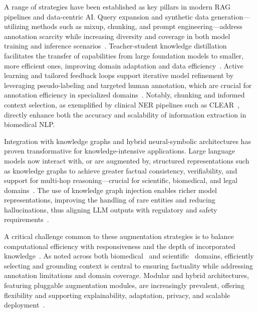 \documentclass[sigconf]{acmart}
\begin{document}
A range of strategies have been established as key pillars in modern RAG pipelines and data-centric AI. Query expansion and synthetic data generation—utilizing methods such as mixup, chunking, and prompt engineering—address annotation scarcity while increasing diversity and coverage in both model training and inference scenarios~\cite{ref5, ref10, ref12, ref15, ref16, ref22, ref24, ref31, ref32, ref36, ref37, ref43, ref48, ref49, ref52, ref54, ref55, ref61, ref62}. Teacher-student knowledge distillation facilitates the transfer of capabilities from large foundation models to smaller, more efficient ones, improving domain adaptation and data efficiency~\cite{ref32, ref33, ref55}. Active learning and tailored feedback loops support iterative model refinement by leveraging pseudo-labeling and targeted human annotation, which are crucial for annotation efficiency in specialized domains~\cite{ref31, ref32, ref55}. Notably, chunking and informed context selection, as exemplified by clinical NER pipelines such as CLEAR~\cite{ref3, ref5, ref36, ref43, ref54, ref61}, directly enhance both the accuracy and scalability of information extraction in biomedical NLP.

Integration with knowledge graphs and hybrid neural-symbolic architectures has proven transformative for knowledge-intensive applications. Large language models now interact with, or are augmented by, structured representations such as knowledge graphs to achieve greater factual consistency, verifiability, and support for multi-hop reasoning—crucial for scientific, biomedical, and legal domains~\cite{ref3, ref8, ref10, ref12, ref29, ref31, ref37, ref47, ref48, ref52, ref54, ref63}. The use of knowledge graph injection enables richer model representations, improving the handling of rare entities and reducing hallucinations, thus aligning LLM outputs with regulatory and safety requirements~\cite{ref3, ref29, ref47, ref54, ref63}.

A critical challenge common to these augmentation strategies is to balance computational efficiency with responsiveness and the depth of incorporated knowledge~\cite{ref10, ref12, ref48, ref54, ref55, ref61, ref62}. As noted across both biomedical~\cite{ref5, ref52, ref54, ref55, ref48, ref49} and scientific~\cite{ref29, ref31, ref36, ref37, ref47} domains, efficiently selecting and grounding context is central to ensuring factuality while addressing annotation limitations and domain coverage. Modular and hybrid architectures, featuring pluggable augmentation modules, are increasingly prevalent, offering flexibility and supporting explainability, adaptation, privacy, and scalable deployment~\cite{ref31, ref32, ref33, ref55}.
\end{document}
